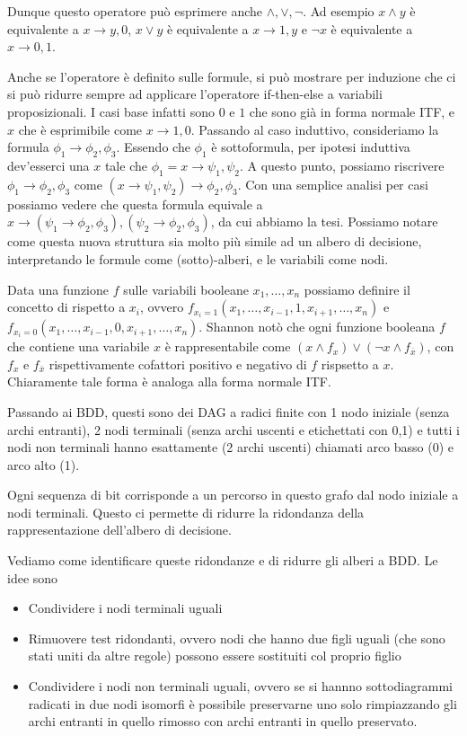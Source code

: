 Dunque questo operatore può esprimere anche \(\land,\lor, \neg\). Ad esempio \(x \land y\) è equivalente a \(x \to y,0\), \(x \lor y\) è equivalente a \(x \to 1,y\) e \(\neg x\) è equivalente a \(x \to 0,1\).

Anche se l'operatore è definito sulle formule, si può mostrare per induzione che ci si può ridurre sempre ad applicare l'operatore if-then-else a variabili proposizionali. I casi base infatti sono \(0\) e \(1\) che sono già in forma normale ITF\@, e \(x\) che è esprimibile come \(x\to 1,0\). Passando al caso induttivo, consideriamo la formula \(\phi_1 \to \phi_2,\phi_3\). Essendo che \(\phi_1\) è sottoformula, per ipotesi induttiva dev'esserci una \(x\) tale che \(\phi_1 = x \to \psi_1,\psi_2\). A questo punto, possiamo riscrivere \(\phi_1 \to \phi_2,\phi_3\) come \((x \to \psi_1,\psi_2) \to \phi_2,\phi_3\). Con una semplice analisi per casi possiamo vedere che questa formula equivale a \(x\to(\psi_1\to\phi_2,\phi_3),(\psi_2\to\phi_2,\phi_3)\), da cui abbiamo la tesi. Possiamo notare come questa nuova struttura sia molto più simile ad un albero di decisione, interpretando le formule come (sotto)-alberi, e le variabili come nodi.

Data una funzione \(f\) sulle variabili booleane \(x_1,\dots,x_n\) possiamo definire il concetto di  rispetto a \(x_i\), ovvero \(f_{x_i = 1}(x_1, \ldots, x_{i-1}, 1, x_{i+1}, \ldots, x_n)\) e \(f_{x_i = 0}(x_1, \ldots, x_{i-1}, 0, x_{i+1}, \ldots, x_n)\). Shannon notò che ogni funzione booleana \(f\) che contiene una variabile \(x\) è rappresentabile come \((x\land f_x) \lor (\neg x \land f_{\overline{x}})\), con \(f_x\) e \(f_{\overline{x}}\) rispettivamente cofattori positivo e negativo di \(f\) rispsetto a \(x\). Chiaramente tale forma è analoga alla forma normale ITF.

Passando ai BDD, questi sono dei DAG a radici finite con 1 nodo iniziale (senza archi entranti), 2 nodi terminali (senza archi uscenti e etichettati con 0,1) e tutti i nodi non terminali hanno esattamente (2 archi uscenti) chiamati arco basso (0) e arco alto (1).

Ogni sequenza di bit corrisponde a un percorso in questo grafo dal nodo iniziale a nodi terminali. Questo ci permette di ridurre la ridondanza della rappresentazione dell'albero di decisione.

Vediamo come identificare queste ridondanze e di ridurre gli alberi a BDD. Le idee sono
\begin{itemize}
  \item Condividere i nodi terminali uguali
  \item Rimuovere test ridondanti, ovvero nodi che hanno due figli uguali (che sono stati uniti da altre regole) possono essere sostituiti col proprio figlio
  \item Condividere i nodi non terminali uguali, ovvero se si hannno sottodiagrammi radicati in due nodi isomorfi è possibile preservarne uno solo rimpiazzando gli archi entranti in quello rimosso con archi entranti in quello preservato.
\end{itemize}

